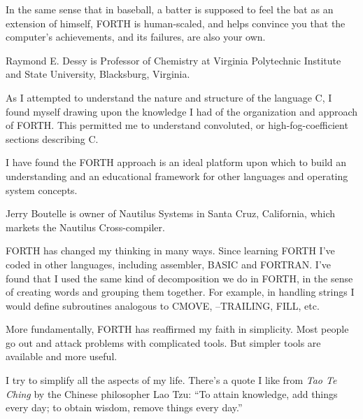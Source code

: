 \begin{interview}
\begin{tfquot}
In the same sense that in baseball, a batter is supposed to feel the bat as an 
extension of himself, FORTH is human-scaled, and helps convince you that
the computer's achievements, and its failures, are also your own.
\end{tfquot}
Raymond E. Dessy is Professor of Chemistry at Virginia Polytechnic Institute
and State University, Blacksburg, Virginia.
\begin{tfquot}
As I attempted to understand the nature and structure of the language C, I 
found myself drawing upon the knowledge I had of the organization and
approach of FORTH.  This permitted me to understand convoluted, or
high-fog-coefficient sections describing C.

I have found the FORTH approach is an ideal platform upon which to build
an understanding and an educational framework for other languages and
operating system concepts.
\end{tfquot}
Jerry Boutelle is owner of Nautilus Systems in Santa Cruz, California, 
which markets the Nautilus Cross-compiler.
\begin{tfquot}
FORTH has changed my thinking in many ways.  Since learning FORTH 
I've coded in other languages, including assembler, BASIC and FORTRAN.
I've found that I used the same kind of decomposition we do in
FORTH, in the sense of creating words and grouping them together.  For
example, in handling strings I would define subroutines analogous to
CMOVE, --TRAILING, FILL, etc.

More fundamentally, FORTH has reaffirmed my faith in simplicity.  Most 
people go out and attack problems with complicated tools.  But simpler
tools are available and more useful.

I try to simplify all the aspects of my life.  There's a quote I like
from {\em Tao Te Ching}
by the Chinese philosopher Lao Tzu: ``To attain knowledge, add 
things every day; to obtain wisdom, remove things every day.''
\end{tfquot}
\end{interview}
